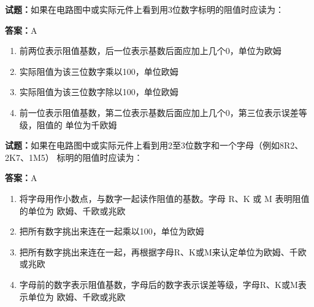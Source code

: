 \documentclass{ctexbook}
\begin{document}





\vspace{1em}

\textbf{试题：}如果在电路图中或实际元件上看到用3位数字标明的阻值时应读为： 

\textbf{答案：}A 

\begin{enumerate}[leftmargin=3em]
  \item 前两位表示阻值基数，后一位表示基数后面应加上几个0，单位为欧姆 

  \item 实际阻值为该三位数字乘以100，单位欧姆 

  \item 实际阻值为该三位数字除以100，单位欧姆 

  \item 前一位表示阻值基数，第二位表示基数后面应加上几个0，第三位表示误差等级，阻值的
单位为千欧姆 

\end{enumerate}





\vspace{1em}

\textbf{试题：}如果在电路图中或实际元件上看到用2至3位数字和一个字母（例如8R2、2K7、1M5）
标明的阻值时应读为： 

\textbf{答案：}A 

\begin{enumerate}[leftmargin=3em]
  \item 将字母用作小数点，与数字一起读作阻值的基数。字母 R、K 或 M 表明阻值的单位为
欧姆、千欧或兆欧 

  \item 把所有数字挑出来连在一起乘以100，单位为欧姆 

  \item 把所有数字挑出来连在一起，再根据字母R、K或M来认定单位为欧姆、千欧或兆欧 

  \item 字母前的数字表示阻值基数，字母后的数字表示误差等级，字母R、K或M表示单位为
欧姆、千欧或兆欧 

\end{enumerate}


\end{document}
